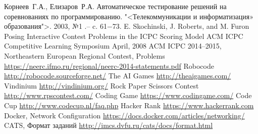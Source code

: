 \documentclass{imcs}
\begin{document}
\begin{thebibliography}{99}
 Корнеев~Г.А., Елизаров~Р.А. Автоматическое тестирование решений
на соревнованиях по программированию. "<Телекоммуникации  и  информатизация»
образования">. 2003, №1 .– c. 61−73.
 E. Skochinski, J. Roberts, and M. Furon Posing Interactive Contest Problems in the ICPC Scoring Model ACM ICPC Competitive Learning Symposium April, 2008
 ACM ICPC 2014–2015, Northeastern European Regional Contest, Problems \url{https://neerc.ifmo.ru/regional/neerc-2014-statements.pdf}
 Robocode \url{http://robocode.sourceforge.net/}
 The AI Games \url{http://theaigames.com/}
 Vindinium \url{http://vindinium.org/}
 Rock Paper Scissors Contest \url{http://www.rpscontest.com/}
 Coding Game \url{https://www.codingame.com/}
 Code Cup \url{http://www.codecup.nl/faq.php}
 Hacker Rank \url{https://www.hackerrank.com}
 Docker, Network Configuration \url{https://docs.docker.com/articles/networking/}
 CATS, Формат заданий \url{http://imcs.dvfu.ru/cats/docs/format.html}

\end{thebibliography}

\pagebreak
\end{document}
